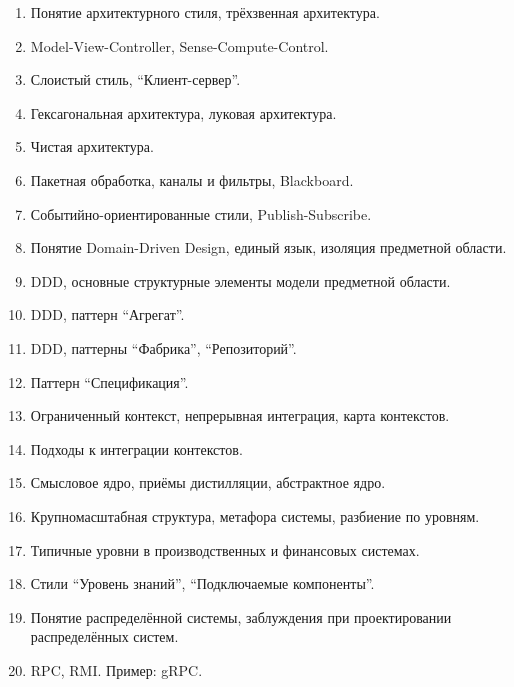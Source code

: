 \documentclass[a5paper]{article}
\begin{document}
\begin{enumerate}
    \item Понятие архитектурного стиля, трёхзвенная архитектура.
    \item Model-View-Controller, Sense-Compute-Control.
    \item Слоистый стиль, \enquote{Клиент-сервер}.
    \item Гексагональная архитектура, луковая архитектура.
    \item Чистая архитектура.
    \item Пакетная обработка, каналы и фильтры, Blackboard.
    \item Событийно-ориентированные стили, Publish-Subscribe.
    \item Понятие Domain-Driven Design, единый язык, изоляция предметной области.
    \item DDD, основные структурные элементы модели предметной области.
    \item DDD, паттерн \enquote{Агрегат}.
    \item DDD, паттерны \enquote{Фабрика}, \enquote{Репозиторий}.
    \item Паттерн \enquote{Спецификация}.
	\item Ограниченный контекст, непрерывная интеграция, карта контекстов.
    \item Подходы к интеграции контекстов.
    \item Смысловое ядро, приёмы дистилляции, абстрактное ядро.
    \item Крупномасштабная структура, метафора системы, разбиение по уровням. 
    \item Типичные уровни в производственных и финансовых системах.
    \item Стили \enquote{Уровень знаний}, \enquote{Подключаемые компоненты}.
    \item Понятие распределённой системы, заблуждения при проектировании распределённых систем.
    \item RPC, RMI. Пример: gRPC.

\end{enumerate}
\end{document}
